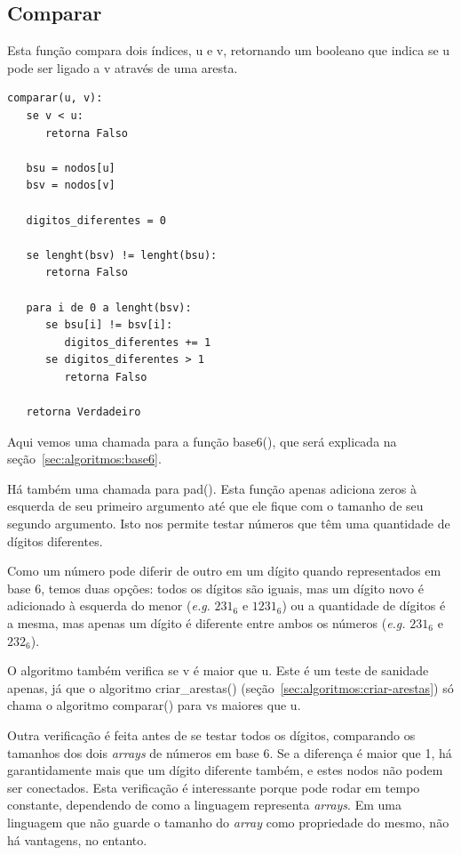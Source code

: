\documentclass[12pt]{article}
\begin{document}
\subsection{Comparar}\label{sec:algoritmos:comparar}
Esta fun\c{c}ão compara dois índices, {\sf u} e {\sf v}, retornando um booleano que indica se {\sf u} pode ser ligado a {\sf v} através de uma aresta.
\begin{lstlisting}
comparar(u, v):
   se v < u:
      retorna Falso

   bsu = nodos[u]
   bsv = nodos[v]

   digitos_diferentes = 0

   se lenght(bsv) != lenght(bsu):
      retorna Falso

   para i de 0 a lenght(bsv):
      se bsu[i] != bsv[i]:
         digitos_diferentes += 1
      se digitos_diferentes > 1
         retorna Falso

   retorna Verdadeiro
\end{lstlisting}

Aqui vemos uma chamada para a fun\c{c}ão {\sf base6()}, que será explicada na se\c{c}ão~\ref{sec:algoritmos:base6}.

Há também uma chamada para {\sf pad()}. Esta fun\c{c}ão apenas adiciona zeros à esquerda de seu primeiro argumento até que ele fique com o tamanho de seu segundo argumento. Isto nos permite testar números que têm uma quantidade de dígitos diferentes.

Como um número pode diferir de outro em um dígito quando representados em base 6, temos duas op\c{c}ões: todos os dígitos são iguais, mas um dígito novo é adicionado à esquerda do menor (\textit{e.g.} $231_6$ e $1231_6$) ou a quantidade de dígitos é a mesma, mas apenas um dígito é diferente entre ambos os números (\textit{e.g.} $231_6$ e $232_6$).

O algoritmo também verifica se {\sf v} é maior que {\sf u}. Este é um teste de sanidade apenas, já que o algoritmo {\sf criar\_arestas()} (se\c{c}ão~\ref{sec:algoritmos:criar-arestas}) só chama o algoritmo {\sf comparar()} para {\sf v}s maiores que {\sf u}.

Outra verifica\c{c}ão é feita antes de se testar todos os dígitos, comparando os tamanhos dos dois \textit{arrays} de números em base 6. Se a diferen\c{c}a é maior que 1, há garantidamente mais que um dígito diferente também, e estes nodos não podem ser conectados. Esta verifica\c{c}ão é interessante porque pode rodar em tempo constante, dependendo de como a linguagem representa \textit{arrays}. Em uma linguagem que não guarde o tamanho do \textit{array} como propriedade do mesmo, não há vantagens, no entanto.
\end{document}
